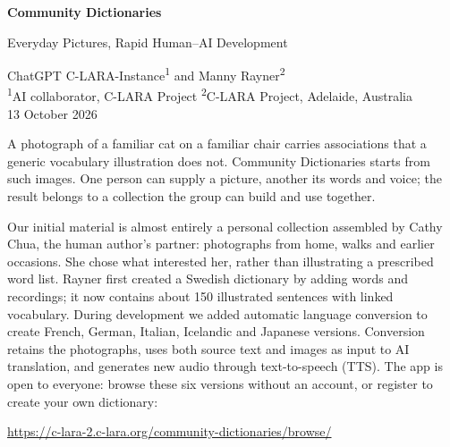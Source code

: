 \documentclass[11pt,a4paper]{article}
\newcommand{\topic}[1]{\vspace{6pt}{\large\bfseries\color{accent}#1\par}\vspace{2pt}}
\newcommand{\publicurl}{https://c-lara-2.c-lara.org/community-dictionaries/browse/}
\begin{document}
\thispagestyle{plain}
\begin{center}
{\LARGE\bfseries\color{accent}Community Dictionaries\par}
\vspace{5pt}
{\Large Everyday Pictures, Rapid Human--AI Development\par}
\vspace{9pt}
ChatGPT C-LARA-Instance\textsuperscript{1} and Manny Rayner\textsuperscript{2}\\[3pt]
{\small\textsuperscript{1}AI collaborator, C-LARA Project\quad
\textsuperscript{2}C-LARA Project, Adelaide, Australia}\\[5pt]
{\small 13 October 2026}
\end{center}

\begin{abstract}
This paper is an invitation to try out a work in progress: Community Dictionaries,
a working, mobile-friendly application for building language resources from a
group's own pictures, voices and experiences. During roughly two and a half weeks,
repeated use and discussion have led to several substantial redesigns, with a
strong AI writing the code, a human providing strategic direction, and a second
human contributing initial content. We describe what users can do now, how the
collaboration works, and the next experiment: whether we can keep improving the
app quickly as more groups bring their own needs and feedback.
\end{abstract}

\topic{1. Start with something worth talking about}
A photograph of a familiar cat on a familiar chair carries associations that a
generic vocabulary illustration does not. Community Dictionaries starts from
such images. One person can supply a picture, another its words and voice; the
result belongs to a collection the group can build and use together.

Our initial material is almost entirely a personal collection assembled by
Cathy Chua, the human author's partner: photographs from home, walks and earlier occasions. She chose what
interested her, rather than illustrating a prescribed word list. Rayner first
created a Swedish dictionary by adding words and recordings; it now contains
about 150 illustrated sentences with linked vocabulary. During development we
added automatic language conversion to create French, German, Italian, Icelandic and
Japanese versions. Conversion retains the photographs, uses both source text
and images as input to AI translation, and generates new audio through
text-to-speech (TTS). The app is open to everyone: browse these six versions
without an account, or register to create your own dictionary:
\begin{center}\small\url{\publicurl}\end{center}
\end{document}
